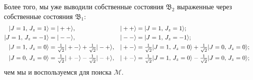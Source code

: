 Более того, мы уже выводили собственные состояния $\mathfrak B_2$ выраженные через собственные состояния $\mathfrak B_1$:
 \begin{align*}
     | J=1,\, J_z=1 \rangle &= | ++ \rangle, 
     &| ++ \rangle &= | J=1,\, J_z=1 \rangle;
     \\
     | J=1,\, J_z=-1 \rangle &= | -- \rangle, 
     & | -- \rangle &= | J=1,\, J_z=-1 \rangle;
     \\
     | J=1,\, J_z=0 \rangle &= \textstyle \frac{1}{\sqrt{2}} | +- \rangle + \textstyle \frac{1}{\sqrt{2}} | -+ \rangle, 
     & | +- \rangle &=  \textstyle \frac{1}{\sqrt{2}} | J=1,\, J_z=0 \rangle + \textstyle \frac{1}{\sqrt{2}} | J=0,\, J_z=0 \rangle;
     \\
     | J=0,\, J_z=0 \rangle &= \textstyle \frac{1}{\sqrt{2}} | +- \rangle - \textstyle \frac{1}{\sqrt{2}} | -+ \rangle, 
     & | +- \rangle &=  \textstyle \frac{1}{\sqrt{2}} | J=1,\, J_z=0 \rangle - \textstyle \frac{1}{\sqrt{2}} | J=0,\, J_z=0 \rangle;
 \end{align*}
 чем мы и воспользуемся для поиска $\mathcal M$.

